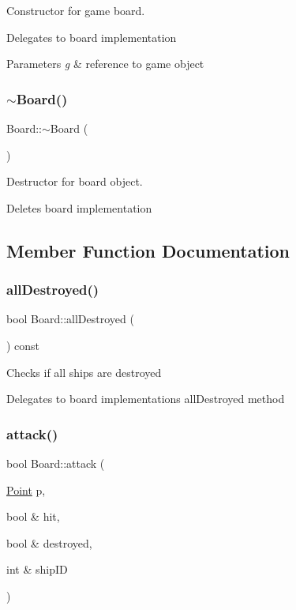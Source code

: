 Constructor for game board. 

Delegates to board implementation 
\begin{DoxyParams}{Parameters}
{\em g} & reference to game object \\
\hline
\end{DoxyParams}
\mbox{\label{class_board_af73f45730119a1fd8f6670f53f959e68}} 
\subsubsection{\texorpdfstring{$\sim$\+Board()}{~Board()}}
{\footnotesize\ttfamily Board\+::$\sim$\+Board (\begin{DoxyParamCaption}{ }\end{DoxyParamCaption})}



Destructor for board object. 

Deletes board implementation 

\subsection{Member Function Documentation}
\mbox{\label{class_board_a4653d3028e70fea9f56523173a2e0a13}} 
\subsubsection{\texorpdfstring{all\+Destroyed()}{allDestroyed()}}
{\footnotesize\ttfamily bool Board\+::all\+Destroyed (\begin{DoxyParamCaption}{ }\end{DoxyParamCaption}) const}

Checks if all ships are destroyed

Delegates to board implementation\textquotesingle{}s all\+Destroyed method \mbox{\label{class_board_aad9932b230d16c6eef6fd9305399fbd2}} 
\subsubsection{\texorpdfstring{attack()}{attack()}}
{\footnotesize\ttfamily bool Board\+::attack (\begin{DoxyParamCaption}\item[{\mbox{\hyperlink{class_point}{Point}}}]{p,  }\item[{bool \&}]{hit,  }\item[{bool \&}]{destroyed,  }\item[{int \&}]{ship\+ID }\end{DoxyParamCaption})}



